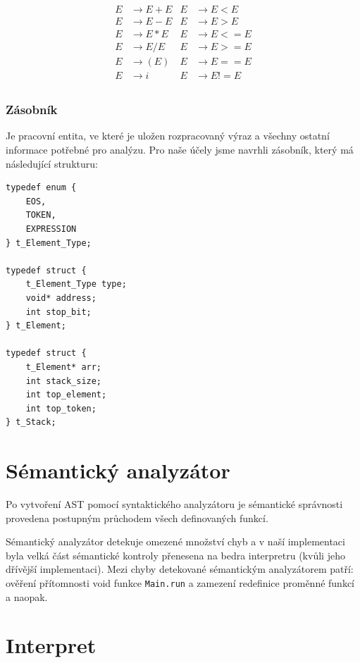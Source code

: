 \documentclass[a4paper,11pt]{article}
\begin{document}
\begin{align*}
E &\rightarrow E + E  &   E &\rightarrow E < E\\
E &\rightarrow E - E  &   E &\rightarrow E > E\\
E &\rightarrow E * E  &   E &\rightarrow E <= E\\
E &\rightarrow E / E  &   E &\rightarrow E >= E\\
E &\rightarrow ( E )  &   E &\rightarrow E == E\\
E &\rightarrow i      &   E &\rightarrow E != E\\
\end{align*}

\subsubsection{Zásobník}
Je pracovní entita, ve které je uložen rozpracovaný výraz a všechny ostatní informace potřebné pro analýzu. Pro naše účely jsme navrhli zásobník, který má následující strukturu:

\begin{lstlisting}[caption={Struktura zásobníku}, label={lst:saStack}]
typedef enum {
    EOS,
    TOKEN,
    EXPRESSION
} t_Element_Type;

typedef struct {
    t_Element_Type type;
    void* address;
    int stop_bit;
} t_Element;

typedef struct {
    t_Element* arr;
    int stack_size;
    int top_element;
    int top_token;
} t_Stack;

\end{lstlisting}


\section{Sémantický analyzátor}
Po vytvoření AST pomocí syntaktického analyzátoru je sémantické správnosti provedena postupným průchodem všech definovaných funkcí.

Sémantický analyzátor detekuje omezené množství chyb a v naší implementaci byla velká část sémantické kontroly přenesena na bedra interpretru (kvůli jeho dřívější implementaci). Mezi chyby detekované sémantickým analyzátorem patří: ověření přítomnosti void funkce \texttt{Main.run} a zamezení redefinice proměnné funkcí a naopak.

\section{Interpret}
\end{document}

